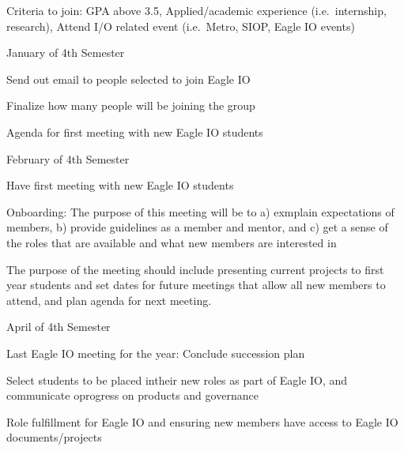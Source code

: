 \documentclass[
]{book}
\begin{document}
Criteria to join: GPA above 3.5, Applied/academic experience (i.e.~internship, research), Attend I/O related event (i.e.~Metro, SIOP, Eagle IO events)

January of 4th Semester

Send out email to people selected to join Eagle IO

Finalize how many people will be joining the group

Agenda for first meeting with new Eagle IO students

February of 4th Semester

Have first meeting with new Eagle IO students

Onboarding: The purpose of this meeting will be to a) exmplain expectations of members, b) provide guidelines as a member and mentor, and c) get a sense of the roles that are available and what new members are interested in

The purpose of the meeting should include presenting current projects to first year students and set dates for future meetings that allow all new members to attend, and plan agenda for next meeting.

April of 4th Semester

Last Eagle IO meeting for the year: Conclude succession plan

Select students to be placed intheir new roles as part of Eagle IO, and communicate oprogress on products and governance

Role fulfillment for Eagle IO and ensuring new members have access to Eagle IO documents/projects

  
\end{document}
